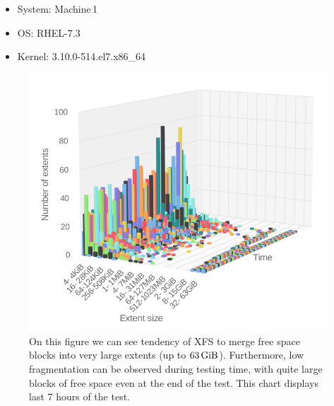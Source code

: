 \documentclass[
  color, %
  table, %
  lof,   %
  lot,   %
]{fithesis3}
\begin{document}
\begin{itemize}
\itemsep0em 
   \item System: Machine\,1
   \item OS: RHEL-7.3
   \item Kernel: 3.10.0-514.el7.x86\_64
\end{itemize}


\begin{figure}[!htb]
        \centering
        \includegraphics[width=\textwidth]{../charts/HDD_xfs/free80.png}
        \caption[Free space fragmentation of XFS during testing of medium utilisation of HDD]{On this figure we can see tendency of XFS to merge free space blocks into very large extents (up to $\SI{63}{\gibi\byte}$). Furthermore, low fragmentation can be observed during testing time, with quite large blocks of free space even at the end of the test. This chart displays last 7 hours of the test.}
\label{fig:free80_xfs}
\end{figure}
\end{document}
